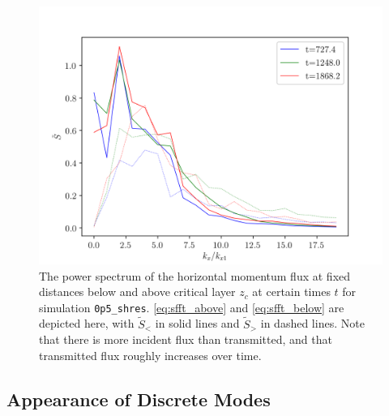 \documentclass[
        fleqn,
        usenatbib,
    ]{mnras}
\begin{document}
\begin{figure}[t]
    \centering
    \includegraphics[width=\columnwidth]{plots/nl_fft.png}
    \caption{The power spectrum of the horizontal momentum flux at fixed
    distances below and above critical layer $z_c$ at certain times $t$ for
    simulation \texttt{0p5\_shres}. \autoref{eq:sfft_above} and
    \autoref{eq:sfft_below} are depicted here, with $\tilde{S}_<$ in solid lines
    and $\tilde{S}_>$ in dashed lines. Note that there is more incident flux
    than transmitted, and that transmitted flux roughly increases over
    time.}\label{fig:nl_fft}
\end{figure}

\subsection{Appearance of Discrete Modes}\label{ss:modes}
\end{document}

